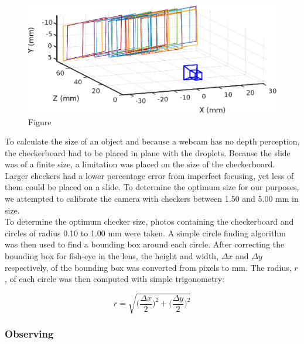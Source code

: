 \documentclass{physics_article_B}
\begin{document}
                \begin{figure}[H]
                    \centering
                        \includegraphics[]{Figures/CameraExtrinsics.eps}
                    \caption{Figure }\label{fig:calib}
                \end{figure}
        
            To calculate the size of an object and because a webcam has no depth perception, the checkerboard had to be placed in plane with the droplets. Because the slide was of a finite size, a limitation was placed on the size of the checkerboard. Larger checkers had a lower percentage error from imperfect focusing, yet less of them could be placed on a slide. To determine the optimum size for our purposes, we attempted to calibrate the camera with checkers between 1.50 and 5.00 mm in size. \\
            
            To determine the optimum checker size, photos containing the checkerboard and circles of radius 0.10 to 1.00 mm were taken. A simple circle finding algorithm was then used to find a bounding box around each circle. After correcting the bounding box for fish-eye in the lens, the height and width, $\Delta x$ and $\Delta y$ respectively, of the bounding box was converted from pixels to mm. The radius, $r$, of each circle was then computed with simple trigonometry:
            
                \begin{equation}\label{eq:radii}
                    r = \sqrt{\Big(\frac{\Delta x}{2}\Big)^2 + \Big(\frac{\Delta y}{2}\Big)^2}
                \end{equation}
            
            \vspace{3pt} 
            
        \subsubsection{Observing}
        
\end{document}
